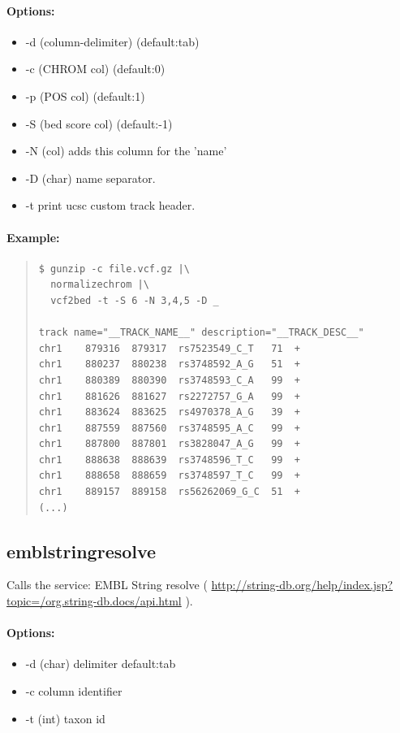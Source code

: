 \documentclass[12pt]{article}
\begin{document}
\paragraph{Options:}
\begin{itemize}
\item-d (column-delimiter) (default:tab)
\item-c (CHROM col) (default:0)
\item-p (POS col) (default:1)
\item-S (bed score col) (default:-1)
\item-N (col) adds this column for the 'name'
\item-D (char) name separator.
\item-t print ucsc custom track header.
\end{itemize}
\paragraph{Example:}

\begin{quote}
\begin{verbatim}
$ gunzip -c file.vcf.gz |\
  normalizechrom |\
  vcf2bed -t -S 6 -N 3,4,5 -D _

track name="__TRACK_NAME__" description="__TRACK_DESC__" 
chr1	879316	879317	rs7523549_C_T	71	+
chr1	880237	880238	rs3748592_A_G	51	+
chr1	880389	880390	rs3748593_C_A	99	+
chr1	881626	881627	rs2272757_G_A	99	+
chr1	883624	883625	rs4970378_A_G	39	+
chr1	887559	887560	rs3748595_A_C	99	+
chr1	887800	887801	rs3828047_A_G	99	+
chr1	888638	888639	rs3748596_T_C	99	+
chr1	888658	888659	rs3748597_T_C	99	+
chr1	889157	889158	rs56262069_G_C	51	+
(...)
\end{verbatim}
\end{quote}

\subsection{emblstringresolve}
Calls the service: EMBL String resolve ( \url{http://string-db.org/help/index.jsp?topic=/org.string-db.docs/api.html} ).

\paragraph{Options:}
\begin{itemize}
\item-d (char) delimiter default:tab
\item-c column identifier
\item-t (int) taxon id
\end{itemize}
\end{document}
